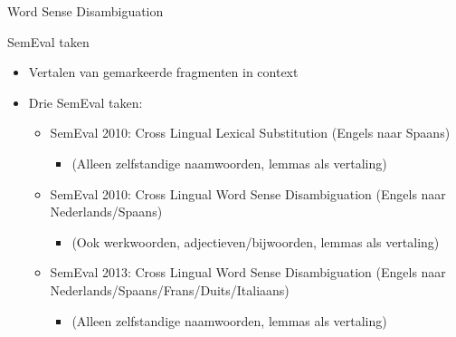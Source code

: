 \documentclass[8pt]{beamer}
\begin{document}
\begin{frame}{Word Sense Disambiguation}

	\begin{block}{SemEval taken}
        \begin{itemize}
            \item Vertalen van gemarkeerde fragmenten in context
            \item Drie SemEval taken:
            \begin{itemize}
                \item SemEval 2010: Cross Lingual Lexical Substitution (Engels naar Spaans) \citep{CLLS}
                \begin{itemize}
                    \item<2-> (Alleen zelfstandige naamwoorden, lemmas als vertaling)
                \end{itemize}
                \item SemEval 2010: Cross Lingual Word Sense Disambiguation (Engels naar Nederlands/Spaans) \citep{WSD}
                \begin{itemize}
                    \item<2-> (Ook werkwoorden, adjectieven/bijwoorden, lemmas als vertaling)
                \end{itemize}
                \item SemEval 2013: Cross Lingual Word Sense Disambiguation (Engels naar
                    Nederlands/Spaans/Frans/Duits/Italiaans) \citep{CLWSD2013TASKPAPER}
                \begin{itemize}
                    \item<2-> (Alleen zelfstandige naamwoorden, lemmas als vertaling)
                \end{itemize}
            \end{itemize}
        \end{itemize}
	\end{block}

\end{frame}
\end{document}
